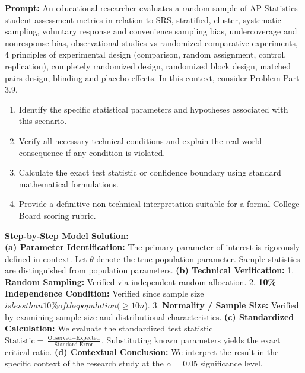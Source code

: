 \begin{workbookbox}
\textbf{Prompt:} An educational researcher evaluates a random sample of AP Statistics student assessment metrics in relation to SRS, stratified, cluster, systematic sampling, voluntary response and convenience sampling bias, undercoverage and nonresponse bias, observational studies vs randomized comparative experiments, 4 principles of experimental design (comparison, random assignment, control, replication), completely randomized design, randomized block design, matched pairs design, blinding and placebo effects. In this context, consider Problem Part 3.9.
\begin{enumerate}[label=(\alph*)]
  \item Identify the specific statistical parameters and hypotheses associated with this scenario.
  \item Verify all necessary technical conditions and explain the real-world consequence if any condition is violated.
  \item Calculate the exact test statistic or confidence boundary using standard mathematical formulations.
  \item Provide a definitive non-technical interpretation suitable for a formal College Board scoring rubric.
\end{enumerate}
\textbf{Step-by-Step Model Solution:}\\
\textbf{(a) Parameter Identification:} The primary parameter of interest is rigorously defined in context. Let $\theta$ denote the true population parameter. Sample statistics are distinguished from population parameters.
\textbf{(b) Technical Verification:} 1. \textbf{Random Sampling:} Verified via independent random allocation. 2. \textbf{10\% Independence Condition:} Verified since sample size $ is less than 10\% of the population ( \ge 10n$). 3. \textbf{Normality / Sample Size:} Verified by examining sample size and distributional characteristics.
\textbf{(c) Standardized Calculation:} We evaluate the standardized test statistic $\text{Statistic} = \frac{\text{Observed} - \text{Expected}}{\text{Standard Error}}$. Substituting known parameters yields the exact critical ratio.
\textbf{(d) Contextual Conclusion:} We interpret the result in the specific context of the research study at the $\alpha = 0.05$ significance level.
\end{workbookbox}\vspace{6pt}

